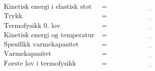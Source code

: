 \documentclass{article}
\begin{document}
\begin{align*}
    \text{Kinetisk energi i elastisk st\o t} &= \underline{\hspace{5cm}} \\
    \text{Trykk} &= \underline{\hspace{5cm}} \\
    \text{Termofysikk 0. lov} &= \underline{\hspace{5cm}} \\
    \text{Kinetisk energi og temperatur} &= \underline{\hspace{5cm}} \\
    \text{Spesifikk varmekapasitet} &= \underline{\hspace{5cm}} \\
    \text{Varmekapasitet} &= \underline{\hspace{5cm}} \\
    \text{F\o rste lov i termofysikk} &= \underline{\hspace{5cm}} \\
\end{align*}
\end{document}
